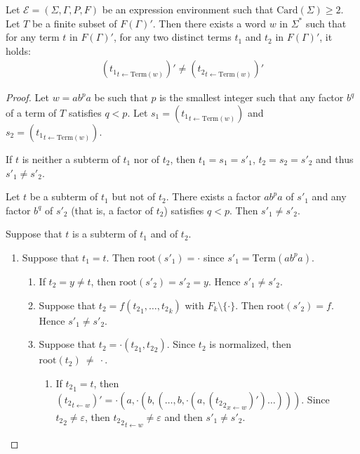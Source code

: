 \documentclass[a4paper]{llncs}
\begin{document}
  \begin{lemma}\label{lem exist mot separ}
    Let $\mathcal{E}=(\Sigma,\Gamma,P,F)$ be an expression environment such that $\mathrm{Card}(\Sigma)\geq 2$. Let $T$ be a finite subset of $F(\Gamma)'$. Then there exists a word $w$ in $\Sigma^*$ such that for any term $t$ in $F(\Gamma)'$, for any two distinct terms $t_1$ and $t_2$ in $F(\Gamma)'$, it holds:
        \begin{align*}
          ({t_1}_{t\leftarrow \mathrm{Term}(w)})'\neq({t_2}_{t\leftarrow \mathrm{Term}(w)})'
        \end{align*}
  \end{lemma}
  \begin{proof} 
  Let $w=ab^pa$ be such that $p$ is the smallest integer such that any factor $b^q$ of a term of $T$ satisfies $q<p$.
  Let $s_1=({t_1}_{t\leftarrow \mathrm{Term}(w)})$ and $s_2=({t_1}_{t\leftarrow \mathrm{Term}(w)})$.     
  
  If $t$ is neither a subterm of $t_1$ nor of $t_2$, then $t_1=s_1=s'_1$, $t_2=s_2=s'_2$ and thus $s'_1\neq s'_2$.
    
  Let $t$ be a subterm of $t_1$ but not of $t_2$. There exists a factor $ab^{p}a$ of $s'_1$ and any factor $b^q$ of $s'_2$ (that is, a factor of $t_2$) satisfies $q<p$. Then $s'_1\neq s'_2$.
    
  Suppose that $t$ is a subterm of $t_1$ and of $t_2$. 
  
  \begin{enumerate}
    \item Suppose that $t_1=t$. Then $\mathrm{root}(s'_1)=\cdot$ since $s'_1=\mathrm{Term}(ab^pa)$.
    \begin{enumerate}
    \item If $t_2=y\neq t$, then $\mathrm{root}(s'_2)=s'_2=y$. Hence $s'_1\neq s'_2$.
    
    \item\label{1b} Suppose that $t_2=f({t_2}_1,\ldots,{t_2}_k)$ with $F_k\setminus\{\cdot\}$. Then $\mathrm{root}(s'_2)=f$. Hence $s'_1\neq s'_2$.
    
    \item\label{1c} Suppose that $t_2=\cdot({t_2}_1,{t_2}_2)$. Since $t_2$ is normalized, then $\mathrm{root}(t_2)~\neq~\cdot$.
    \begin{enumerate}
    \item If ${t_2}_1=t$, then $({t_2}_{t\leftarrow w})'=\cdot(a,\cdot(b,(\ldots,b,\cdot(a,({{t_2}_2}_{x\leftarrow w})')\ldots)))$. Since ${t_2}_2\neq\varepsilon$, then ${{t_2}_2}_{t\leftarrow w}\neq\varepsilon$ and then $s'_1\neq s'_2$.
    

\end{enumerate}
\end{enumerate}
\end{enumerate}
\end{proof}
\end{document}
